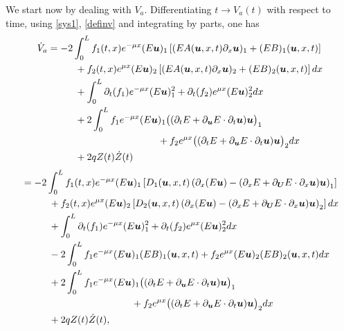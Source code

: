 We start now by dealing with $V_{a}$. Differentiating $t\to V_{a}(t)$ with respect to time, using \eqref{sys1}, \eqref{definv} and integrating by parts, one has
\begin{align}
\label{diffVa0}
\dot V_{a}&= -2\int_{0}^{L}f_{1}(t,x)e^{-\mu x}(E\boldsymbol{u})_{1}\left[(EA(\boldsymbol{u},x,t)\partial_{x} \boldsymbol{u})_{1}+(EB)_{1}(\boldsymbol{u},x,t)\right]\\
&\hspace*{1cm}+f_{2}(t,x)e^{\mu x}(E\boldsymbol{u})_{2}\left[(EA(\boldsymbol{u},x,t)\partial_{x} \boldsymbol{u})_{2}+(EB)_{2}(\boldsymbol{u},x,t)\right]dx\notag\\
&\hspace*{1cm}+\int_{0}^{L}\partial_{t}(f_{1})e^{-\mu x}(E\boldsymbol{u})_{1}^{2}+\partial_{t}(f_{2})e^{\mu x}(E\boldsymbol{u})_{2}^{2}dx
\notag\\
&\hspace*{1cm}+2\int_{0}^{L}f_{1}e^{-\mu x}(E\boldsymbol{u})_{1}\bigl((\partial_{t}E+\partial_{\boldsymbol{u}}E\cdot\partial_{t}\boldsymbol{u})\boldsymbol{u}\bigr)_{1}\notag\\
&\hspace*{4cm}+f_{2}e^{\mu x}\bigl((\partial_{t}E+\partial_{\boldsymbol{u}}E\cdot\partial_{t}\boldsymbol{u})\boldsymbol{u}\bigr)_{2}dx\notag\\
&\hspace*{1cm}+2qZ(t)\dot Z(t)\notag
\end{align}
\begin{align*}
&=-2\int_{0}^{L}f_{1}(t,x)e^{-\mu x}(E\boldsymbol{u})_{1}\left[D_{1}(\boldsymbol{u},x,t)\left(\partial_{x} (E\boldsymbol{u})-(\partial_{x}E+\partial_{\boldsymbol{U}}E\cdot\partial_{x}\boldsymbol{u})\boldsymbol{u}\right)_{1}\right]\\
&\hspace*{1cm}+f_{2}(t,x)e^{\mu x}(E\boldsymbol{u})_{2}\left[D_{2}(\boldsymbol{u},x,t)\left(\partial_{x} (E\boldsymbol{u})-(\partial_{x}E+\partial_{\boldsymbol{U}}E\cdot\partial_{x}\boldsymbol{u})\boldsymbol{u}\right)_{2}\right]dx\\
&\hspace*{1cm}+\int_{0}^{L}\partial_{t}(f_{1})e^{-\mu x}(E\boldsymbol{u})_{1}^{2}+\partial_{t}(f_{2})e^{\mu x}(E\boldsymbol{u})_{2}^{2}dx\\
&\hspace*{1cm}-2\int_{0}^{L}f_{1}e^{-\mu x}(E\boldsymbol{u})_{1}(EB)_{1}(\boldsymbol{u},x,t)+f_{2}e^{\mu x}(E\boldsymbol{u})_{2}(EB)_{2}(\boldsymbol{u},x,t)dx\\
&\hspace*{1cm}+2\int_{0}^{L}f_{1}e^{-\mu x}(E\boldsymbol{u})_{1}\bigl((\partial_{t}E+\partial_{\boldsymbol{u}}E\cdot\partial_{t}\boldsymbol{u})\boldsymbol{u}\bigl)_{1}\\
&\hspace*{4cm}+f_{2}e^{\mu x}\bigl((\partial_{t}E+\partial_{\boldsymbol{u}}E\cdot\partial_{t}\boldsymbol{u})\boldsymbol{u}\bigl)_{2}dx\\
&\hspace*{1cm}+2qZ(t)\dot Z(t),
\end{align*}
